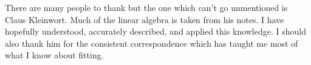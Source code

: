There are many people to thank but the one which can't go unmentioned is Claus Kleinwort. Much of the linear algebra is taken from his notes. I have hopefully understood, accurately described, and applied this knowledge. I should also thank him for the consistent correspondence which has taught me most of what I know about fitting. 
